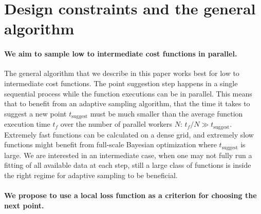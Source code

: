 \hypertarget{design-constraints-and-the-general-algorithm}{%
\section{Design constraints and the general algorithm}\label{design-constraints-and-the-general-algorithm}}

\hypertarget{we-aim-to-sample-low-to-intermediate-cost-functions-in-parallel.}{%
\paragraph{We aim to sample low to intermediate cost functions in parallel.}\label{we-aim-to-sample-low-to-intermediate-cost-functions-in-parallel.}}

The general algorithm that we describe in this paper works best for low to intermediate cost functions.
The point suggestion step happens in a single sequential process while the function executions can be in parallel.
This means that to benefit from an adaptive sampling algorithm, that the time it takes to suggest a new point $t_\textrm{suggest}$ must be much smaller than the average function execution time $t_f$ over the number of parallel workers $N$: $t_f / N \gg t_\textrm{suggest}$.
Extremely fast functions can be calculated on a dense grid, and extremely slow functions might benefit from full-scale Bayesian optimization where $t_\textrm{suggest}$ is large.
We are interested in an intermediate case, when one may not fully run a fitting of all available data at each step, still a large class of functions is inside the right regime for adaptive sampling to be beneficial.

\hypertarget{we-propose-to-use-a-local-loss-function-as-a-criterion-for-choosing-the-next-point.}{%
\paragraph{We propose to use a local loss function as a criterion for choosing the next point.}\label{we-propose-to-use-a-local-loss-function-as-a-criterion-for-choosing-the-next-point.}}

